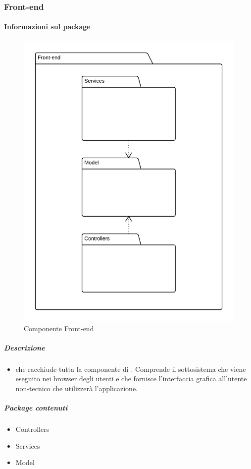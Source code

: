 
	\subsubsection{Front-end}
	\paragraph{Informazioni sul package} 
		\begin{figure}[H] 
			\begin{center} 
				\includegraphics[width=\textwidth]{uml/package/Front-end.png}  
				\caption{Componente Front-end}
			\end{center}  
		\end{figure} 
	\subparagraph{Descrizione} 
		\begin{itemize}
		\item[]  che racchiude tutta la componente di . Comprende il sottosistema che viene eseguito nei browser degli utenti e che fornisce l'interfaccia grafica all'utente non-tecnico che utilizzerà l'applicazione.
		\end{itemize} 
		\subparagraph{Package contenuti} 
		\begin{itemize}
				\item Controllers
				\item Services
				\item Model
		\end{itemize}
